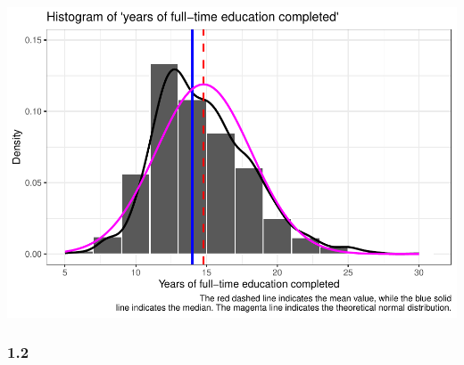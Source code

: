 \documentclass[
]{article}
\begin{document}
\begin{center}\includegraphics{AVCD-Assignment1-Edenhofer_files/figure-latex/distribution-eduyears-normal-1} \end{center}

\hypertarget{section-8}{%
\subsubsection{1.2}\label{section-8}}
\end{document}

